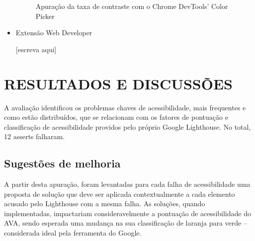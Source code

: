 \documentclass[
	12pt,				%
	openright,			%
	oneside,			%
	a4paper,			%
	chapter=TITLE,		%
	section=TITLE,		%
	subsection=TITLE,	%
	subsubsection=TITLE,%
	english,			%
	brazil				%
	]{abntex2}
\theoremstyle{definition}
\begin{document}
\begin{itemize}
\begin{figure}[!h]
\centering
\caption{Apuração da taxa de contraste com o Chrome DevTools’ Color Picker }
\label{Apuração da taxa de contraste com o Chrome DevTools’ Color Picker }
\end{figure}

    \item Extensão Web Developer
    
[escreva aqui]
    
\end{itemize}

\chapter{RESULTADOS E DISCUSSÕES}

A avaliação identificou os problemas chaves de acessibilidade, mais frequentes e como estão distribuídos, que se relacionam com os fatores de pontuação e classificação de acessibilidade providos pelo próprio Google Lighthouse. No total, 12 asserts falharam.

\section{Sugestões de melhoria}

A partir desta apuração, foram levantadas para cada falha de acessibilidade uma proposta de solução que deve ser aplicada contextualmente a cada elemento acusado pelo Lighthouse com a mesma falha. As soluções, quando implementadas, impactariam consideravelmente a pontuação de acessibilidade do AVA, sendo esperada uma mudança na sua classificação de laranja para verde – considerada ideal pela ferramenta do Google.
\end{document}
